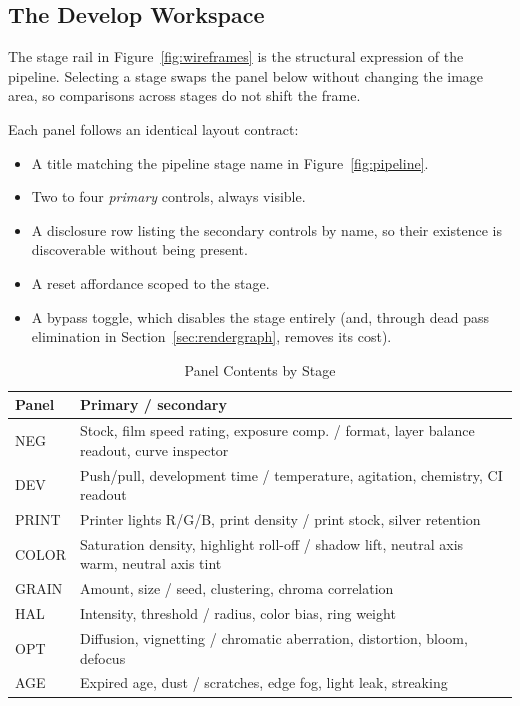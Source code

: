 \subsection{The Develop Workspace}

The stage rail in Figure~\ref{fig:wireframes} is the structural expression of
the pipeline. Selecting a stage swaps the panel below without changing the image
area, so comparisons across stages do not shift the frame.

Each panel follows an identical layout contract:

\begin{itemize}
\item A title matching the pipeline stage name in Figure~\ref{fig:pipeline}.
\item Two to four \emph{primary} controls, always visible.
\item A disclosure row listing the secondary controls by name, so their
existence is discoverable without being present.
\item A reset affordance scoped to the stage.
\item A bypass toggle, which disables the stage entirely (and, through dead
pass elimination in Section~\ref{sec:rendergraph}, removes its cost).
\end{itemize}

\begin{table}[htbp]
\caption{Panel Contents by Stage}
\label{tab:panels}
\begin{center}
\renewcommand{\arraystretch}{1.15}
\begin{tabularx}{\columnwidth}{@{}l>{\raggedright\arraybackslash}X@{}}
\toprule
\textbf{Panel} & \textbf{Primary / secondary} \\
\midrule
NEG & Stock, film speed rating, exposure comp. / format, layer balance readout, curve inspector \\
DEV & Push/pull, development time / temperature, agitation, chemistry, CI readout \\
PRINT & Printer lights R/G/B, print density / print stock, silver retention \\
COLOR & Saturation density, highlight roll-off / shadow lift, neutral axis warm, neutral axis tint \\
GRAIN & Amount, size / seed, clustering, chroma correlation \\
HAL & Intensity, threshold / radius, color bias, ring weight \\
OPT & Diffusion, vignetting / chromatic aberration, distortion, bloom, defocus \\
AGE & Expired age, dust / scratches, edge fog, light leak, streaking \\
\bottomrule
\end{tabularx}
\end{center}
\end{table}

